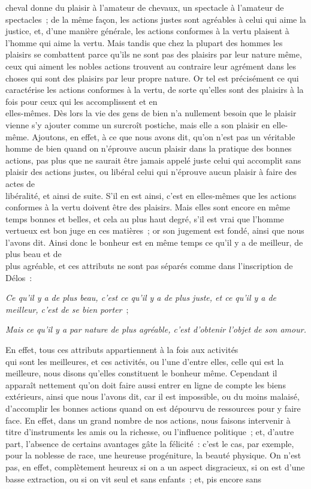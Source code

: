 \documentclass[french,twoside]{book} %
\begin{document}
cheval donne du plaisir à l’amateur de chevaux, un spectacle à l’amateur de spectacles ; de la même façon, les actions justes sont agréables à celui qui aime la justice, et, d’une manière générale, les actions conformes à la vertu plaisent à l’homme qui aime la vertu. Mais tandis que chez la plupart des hommes les plaisirs se combattent parce qu’ils ne sont pas des plaisirs par leur nature même, ceux qui aiment les nobles actions trouvent au contraire leur agrément dans les choses qui sont des plaisirs par leur propre nature. Or tel est précisément ce qui caractérise les actions conformes à la vertu, de sorte qu’elles sont des plaisirs à la fois pour ceux qui les accomplissent et en \\
elles-mêmes. Dès lors la vie des gens de bien n’a nullement besoin que le plaisir vienne s’y ajouter comme un surcroît postiche, mais elle a son plaisir en elle-même. Ajoutons, en effet, à ce que nous avons dit, qu’on n’est pas un véritable homme de bien quand on n’éprouve aucun plaisir dans la pratique des bonnes actions, pas plus que ne saurait être jamais appelé juste celui qui accomplit sans plaisir des actions justes, ou libéral celui qui n’éprouve aucun plaisir à faire des actes de \\
libéralité, et ainsi de suite. S’il en est ainsi, c’est en elles-mêmes que les actions conformes à la vertu doivent être des plaisirs. Mais elles sont encore en même temps bonnes et belles, et cela au plus haut degré, s’il est vrai que l’homme vertueux est bon juge en ces matières ; or son jugement est fondé, ainsi que nous l’avons dit. Ainsi donc le bonheur est en même temps ce qu’il y a de meilleur, de plus beau et de \\
plus agréable, et ces attributs ne sont pas séparés comme dans l’inscription de Délos :\par
{\itshape Ce qu’il y a de plus beau, c’est ce qu’il y a de plus juste, et ce qu’il y a de meilleur, c’est de se bien porter} ; \par
 {\itshape Mais ce qu’il y a par nature de plus agréable, c’est d’obtenir l’objet de son amour.} \par
En effet, tous ces attributs appartiennent à la fois aux activités \\
qui sont les meilleures, et ces activités, ou l’une d’entre elles, celle qui est la meilleure, nous disons qu’elles constituent le bonheur même. Cependant il apparaît nettement qu’on doit faire aussi entrer en ligne de compte les biens extérieurs, ainsi que nous l’avons dit, car il est impossible, ou du moins malaisé, d’accomplir les bonnes actions quand on est dépourvu de ressources pour y faire face. En effet, dans un grand nombre  de nos actions, nous faisons intervenir à titre d’instruments les amis ou la richesse, ou l’influence politique ; et, d’autre part, l’absence de certains avantages gâte la félicité : c’est le cas, par exemple, pour la noblesse de race, une heureuse progéniture, la beauté physique. On n’est pas, en effet, complètement heureux si on a un aspect disgracieux, si on est d’une basse extraction, ou si on vit seul et sans enfants ; et, pis encore sans \\
\end{document}
